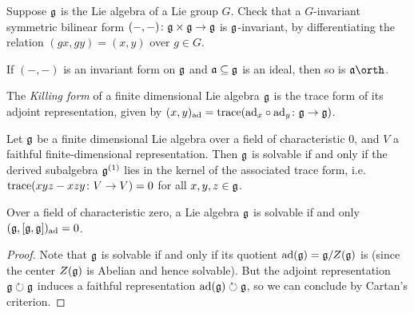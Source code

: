 \begin{exercise}
    Suppose $\mathfrak{g}$ is the Lie algebra of a Lie group $G$. Check that a
    $G$-invariant symmetric bilinear form $(-,-)\colon \mathfrak{g}\times \mathfrak{g}\to
    \mathfrak{g}$ is $\mathfrak{g}$-invariant, by differentiating the relation $(gx,
    gy)=(x,y)$ over $g\in G$.
\end{exercise}

\begin{exercise}
    If $(-,-)$ is an invariant form on $\mathfrak{g}$ and $\mathfrak{a}\subseteq \mathfrak{g}$ is
    an ideal, then so is $\fraka\orth$.
\end{exercise}

\begin{definition}
    The \emph{Killing form} of a finite dimensional Lie algebra
    $\mathfrak{g}$ is the trace form of its adjoint representation, given by
    $(x,y)_{\textnormal{ad}} = \text{trace}(\textnormal{ad}_x\circ \textnormal{ad}_y\colon\mathfrak{g} \to \mathfrak{g})$.
\end{definition}

\begin{theorem}
    Let $\mathfrak{g}$ be a finite dimensional Lie algebra over a field of
    characteristic $0$, and $V$ a faithful finite-dimensional representation.
    Then $\mathfrak{g}$ is solvable if and only if the derived subalgebra
    $\mathfrak{g}^{(1)}$ lies in the kernel of the associated trace form, i.e.\
    $\textnormal{trace}(xyz-xzy\colon V\to V)=0$ for all $x,y,z\in
    \mathfrak{g}$.
\end{theorem}

\begin{corollary}
    Over a field of characteristic zero, a Lie algebra $\mathfrak{g}$ is solvable if
    and only $(\mathfrak{g}, [\mathfrak{g}, \mathfrak{g}])_{\textnormal{ad}}=0$.
    \begin{proof}
        Note that $\mathfrak{g}$ is solvable if and only if its quotient
        $\textnormal{ad}(\mathfrak{g})=\mathfrak{g}/Z(\mathfrak{g})$ is (since the center $Z(\mathfrak{g})$ is Abelian and
        hence solvable). But the adjoint representation $\mathfrak{g}\circlearrowright
        \mathfrak{g}$ induces a faithful representation $\textnormal{ad}(\mathfrak{g})\circlearrowright
        \mathfrak{g}$, so we can conclude by Cartan's criterion.
    \end{proof}
\end{corollary}

